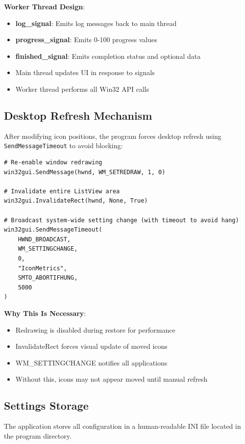 \documentclass[a4paper,11pt]{article}
\begin{document}
\textbf{Worker Thread Design}:
\begin{itemize}
  \item \textbf{log\_signal}: Emits log messages back to main thread
  \item \textbf{progress\_signal}: Emits 0-100 progress values
  \item \textbf{finished\_signal}: Emits completion status and optional data
  \item Main thread updates UI in response to signals
  \item Worker thread performs all Win32 API calls
\end{itemize}

\subsection{Desktop Refresh Mechanism}

After modifying icon positions, the program forces desktop refresh using
\texttt{SendMessageTimeout} to avoid blocking:

\begin{verbatim}
# Re-enable window redrawing
win32gui.SendMessage(hwnd, WM_SETREDRAW, 1, 0)

# Invalidate entire ListView area
win32gui.InvalidateRect(hwnd, None, True)

# Broadcast system-wide setting change (with timeout to avoid hang)
win32gui.SendMessageTimeout(
    HWND_BROADCAST,
    WM_SETTINGCHANGE,
    0,
    "IconMetrics",
    SMTO_ABORTIFHUNG,
    5000
)
\end{verbatim}

\textbf{Why This Is Necessary}:
\begin{itemize}
  \item Redrawing is disabled during restore for performance
  \item InvalidateRect forces visual update of moved icons
  \item WM\_SETTINGCHANGE notifies all applications
  \item Without this, icons may not appear moved until manual refresh
\end{itemize}

\subsection{Settings Storage}

The application stores all configuration in a human-readable INI file
located in the program directory.
\end{document}
